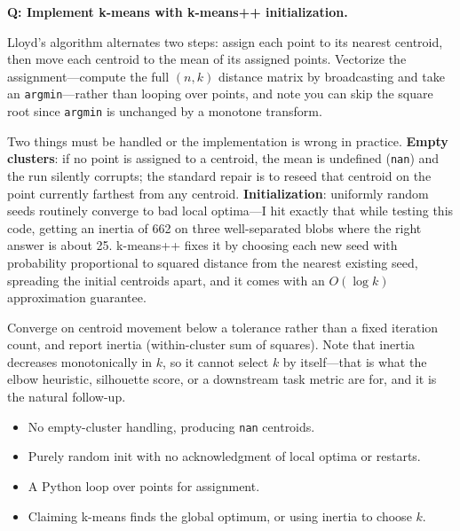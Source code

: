 \begin{interviewq}
\textbf{Q: Implement k-means with k-means++ initialization.}

 \quad {} \quad \badgefreq{\freqhigh}

\stronganswer

Lloyd's algorithm alternates two steps: assign each point to its nearest centroid, then move each centroid to the mean of its assigned points. Vectorize the assignment---compute the full $(n, k)$ distance matrix by broadcasting and take an \texttt{argmin}---rather than looping over points, and note you can skip the square root since \texttt{argmin} is unchanged by a monotone transform.

Two things must be handled or the implementation is wrong in practice. \textbf{Empty clusters}: if no point is assigned to a centroid, the mean is undefined (\texttt{nan}) and the run silently corrupts; the standard repair is to reseed that centroid on the point currently farthest from any centroid. \textbf{Initialization}: uniformly random seeds routinely converge to bad local optima---I hit exactly that while testing this code, getting an inertia of 662 on three well-separated blobs where the right answer is about 25. k-means++ fixes it by choosing each new seed with probability proportional to squared distance from the nearest existing seed, spreading the initial centroids apart, and it comes with an $O(\log k)$ approximation guarantee.

Converge on centroid movement below a tolerance rather than a fixed iteration count, and report inertia (within-cluster sum of squares). Note that inertia decreases monotonically in $k$, so it cannot select $k$ by itself---that is what the elbow heuristic, silhouette score, or a downstream task metric are for, and it is the natural follow-up.

\redflags
\begin{itemize}
    \item No empty-cluster handling, producing \texttt{nan} centroids.
    \item Purely random init with no acknowledgment of local optima or restarts.
    \item A Python loop over points for assignment.
    \item Claiming k-means finds the global optimum, or using inertia to choose $k$.
\end{itemize}



\end{interviewq}
